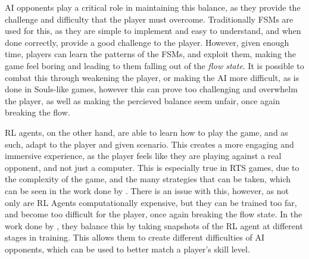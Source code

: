 \documentclass[conference]{IEEEtran}
\begin{document}
AI opponents play a critical role in maintaining this balance, as they provide the challenge and difficulty that the player must overcome. Traditionally FSMs are used for this, as they are simple to implement
and easy to understand, and when done correctly, provide a good challenge to the player. However, given enough time, players can learn the patterns of the FSMs, and exploit them,
making the game feel boring and leading to them falling out of the \textit{flow state}. It is possible to combat this through weakening the player, or making the AI more difficult,
as is done in Souls-like games, however this can prove too challenging and overwhelm the player, as well as making the percieved balance seem unfair, once again breaking the flow.

RL agents, on the other hand, are able to learn how to play the game, and as such, adapt to the player and given scenario. This creates a more engaging
and immersive experience, as the player feels like they are playing against a real opponent, and not just a computer. This is especially true in RTS games,
due to the complexity of the game, and the many strategies that can be taken, which can be seen in the work done by \cite{vinyals_grandmaster_2019}.
There is an issue with this, however, as not only are RL Agents computationally expensive, but they can be trained too far, and become too difficult for the player,
once again breaking the flow state. In the work done by \cite{grech_creating_2023}, they balance this by taking snapshots of the RL agent at different
stages in training. This allows them to create different difficulties of AI opponents, which can be used to better match a player's skill level.



\end{document}
